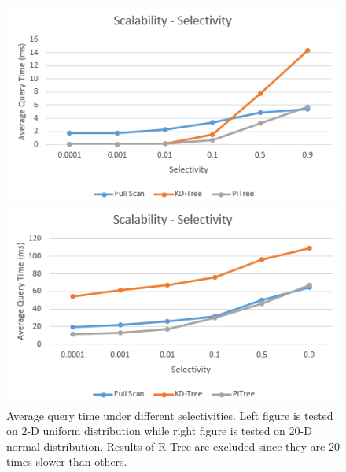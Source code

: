 \documentclass[sigconf,10pt]{acmart}
\begin{document}
\begin{figure}[t] 
  \label{scalability-selectivity} 
  \begin{minipage}[b]{0.45\linewidth}
    \centering
    \includegraphics[width=.8\linewidth]{../figures/scalability/selectivity-random} 
    \vspace{4ex}
  \end{minipage}%
  \begin{minipage}[b]{0.45\linewidth}
    \centering
    \includegraphics[width=.8\linewidth]{../figures/scalability/selectivity-normal} 
    \vspace{4ex}
  \end{minipage}%
  \caption{Average query time under different selectivities. Left figure is tested
  on $2$-D uniform distribution while right figure is tested on $20$-D normal distribution.
  Results of R-Tree are excluded since they are 20 times slower than others.}
\end{figure}
\end{document}

